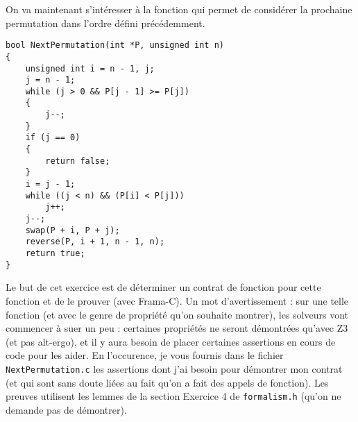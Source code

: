 \documentclass[11pt,answers]{exam}
\begin{document}
\begin{questions}



    On va maintenant s’intéresser à la fonction qui permet de considérer la prochaine permutation dans l’ordre défini précédemment.

    \begin{lstlisting}
bool NextPermutation(int *P, unsigned int n)
{
    unsigned int i = n - 1, j;
    j = n - 1;
    while (j > 0 && P[j - 1] >= P[j])
    {
        j--;
    }
    if (j == 0)
    {
        return false;
    }
    i = j - 1;
    while ((j < n) && (P[i] < P[j]))
        j++;
    j--;
    swap(P + i, P + j);
    reverse(P, i + 1, n - 1, n);
    return true;
}
    \end{lstlisting}

    Le but de cet exercice est de déterminer un contrat de fonction pour cette fonction et de le prouver (avec Frama-C).
    Un mot d’avertissement : sur une telle fonction (et avec le genre de propriété qu’on souhaite montrer), les solveurs vont commencer à suer un peu : certaines propriétés ne seront démontrées qu’avec Z3 (et pas alt-ergo), et il y aura besoin de placer certaines assertions en cours de code pour les aider. En l’occurence, je vous fournis dans le fichier \texttt{NextPermutation.c} les assertions dont j’ai besoin pour démontrer mon contrat (et qui sont sans doute liées au fait qu’on a fait des appels de fonction).
    Les preuves utilisent les lemmes de la section Exercice 4 de \texttt{formalism.h} (qu’on ne demande pas de démontrer).


\end{questions}
\end{document}
